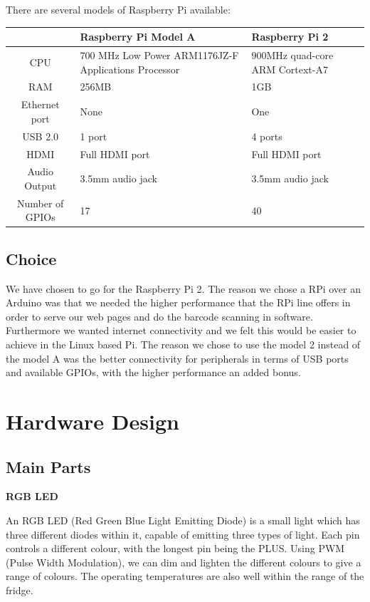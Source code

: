 \documentclass[10pt]{article}
\begin{document}
There are several models of Raspberry Pi available:

\begin{center}
	\begin{tabular}{| c | p{6cm} | p{6cm} |}
		\hline
		  & Raspberry Pi Model A & Raspberry Pi 2 \\ \hline
		CPU & 700 MHz Low Power ARM1176JZ-F Applications Processor & 900MHz quad-core ARM Cortext-A7 \\ \hline
		RAM & 256MB & 1GB \\ \hline
		Ethernet port & None & One \\ \hline
		USB 2.0 & 1 port & 4 ports \\ \hline
		HDMI & Full HDMI port & Full HDMI port \\ \hline
		Audio Output & 3.5mm audio jack & 3.5mm audio jack \\ \hline
		Number of GPIOs & 17 & 40 \\ \hline
	\end{tabular}
\end{center}

\subsection{Choice}
We have chosen to go for the Raspberry Pi 2. The reason we chose a RPi over an Arduino was that we needed the higher performance that the RPi line offers in order to serve our web pages and do the barcode scanning in software. Furthermore we wanted internet connectivity and we felt this would be easier to achieve in the Linux based Pi. The reason we chose to use the model 2 instead of the model A was the better connectivity for peripherals in terms of USB ports and available GPIOs, with the higher performance an added bonus.

\newpage
\section{Hardware Design}
\subsection{Main Parts}
\textbf{RGB LED}

An RGB LED (Red Green Blue Light Emitting Diode) is a small light which has three different diodes within it, capable of emitting three types of light. Each pin controls a different colour, with the longest pin being the PLUS. Using PWM (Pulse Width Modulation), we can dim and lighten the different colours to give a range of colours. The operating temperatures are also well within the range of the fridge.
\end{document}
